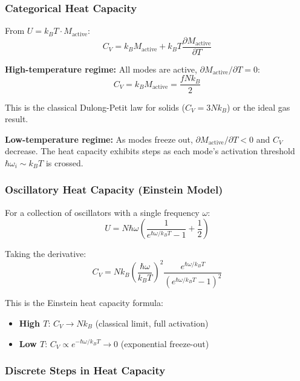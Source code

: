 \subsubsection{Categorical Heat Capacity}

From $U = k_B T \cdot M_{\text{active}}$:
\begin{equation}
C_V = k_B M_{\text{active}} + k_B T \frac{\partial M_{\text{active}}}{\partial T}
\end{equation}

\textbf{High-temperature regime:} All modes are active, $\partial M_{\text{active}}/\partial T = 0$:
\begin{equation}
C_V = k_B M_{\text{active}} = \frac{f N k_B}{2}
\end{equation}

This is the classical Dulong-Petit law for solids ($C_V = 3Nk_B$) or the ideal gas result.

\textbf{Low-temperature regime:} As modes freeze out, $\partial M_{\text{active}}/\partial T < 0$ and $C_V$ decrease. The heat capacity exhibits steps as each mode's activation threshold $\hbar\omega_i \sim k_B T$ is crossed.

\subsubsection{Oscillatory Heat Capacity (Einstein Model)}

For a collection of oscillators with a single frequency $\omega$:
\begin{equation}
U = N \hbar\omega \left(\frac{1}{e^{\hbar\omega/k_B T} - 1} + \frac{1}{2}\right)
\end{equation}

Taking the derivative:
\begin{equation}
C_V = N k_B \left(\frac{\hbar\omega}{k_B T}\right)^2 \frac{e^{\hbar\omega/k_B T}}{(e^{\hbar\omega/k_B T} - 1)^2}
\end{equation}

This is the Einstein heat capacity formula:
\begin{itemize}
\item \textbf{High $T$}: $C_V \to N k_B$ (classical limit, full activation)
\item \textbf{Low $T$}: $C_V \propto e^{-\hbar\omega/k_B T} \to 0$ (exponential freeze-out)
\end{itemize}

\subsubsection{Discrete Steps in Heat Capacity}

